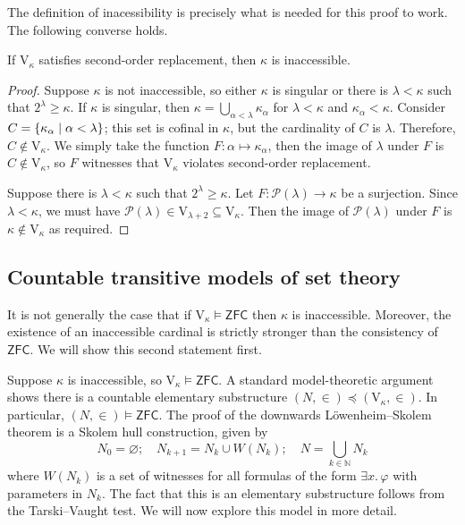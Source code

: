 The definition of inacessibility is precisely what is needed for this proof to work.
The following converse holds.
\begin{theorem}[Shepherdson]
    If \( \mathrm{V}_\kappa \) satisfies second-order replacement, then \( \kappa \) is inaccessible.
\end{theorem}
\begin{proof}
    Suppose \( \kappa \) is not inaccessible, so either \( \kappa \) is singular or there is \( \lambda < \kappa \) such that \( 2^\lambda \geq \kappa \).
    If \( \kappa \) is singular, then \( \kappa = \bigcup_{\alpha < \lambda} \kappa_\alpha \) for \( \lambda < \kappa \) and \( \kappa_\alpha < \kappa \).
    Consider \( C = \qty{\kappa_\alpha \mid \alpha < \lambda} \); this set is cofinal in \( \kappa \), but the cardinality of \( C \) is \( \lambda \).
    Therefore, \( C \notin \mathrm{V}_\kappa \).
    We simply take the function \( F : \alpha \mapsto \kappa_\alpha \), then the image of \( \lambda \) under \( F \) is \( C \notin \mathrm{V}_\kappa \), so \( F \) witnesses that \( \mathrm{V}_\kappa \) violates second-order replacement.

    Suppose there is \( \lambda < \kappa \) such that \( 2^\lambda \geq \kappa \).
    Let \( F : \mathcal P(\lambda) \to \kappa \) be a surjection.
    Since \( \lambda < \kappa \), we must have \( \mathcal P(\lambda) \in \mathrm{V}_{\lambda + 2} \subseteq \mathrm{V}_\kappa \).
    Then the image of \( \mathcal P(\lambda) \) under \( F \) is \( \kappa \notin \mathrm{V}_\kappa \) as required.
\end{proof}

\subsection{Countable transitive models of set theory}
It is not generally the case that if \( \mathrm{V}_\kappa \vDash \mathsf{ZFC} \) then \( \kappa \) is inaccessible.
Moreover, the existence of an inaccessible cardinal is strictly stronger than the consistency of \( \mathsf{ZFC} \).
We will show this second statement first.

Suppose \( \kappa \) is inaccessible, so \( \mathrm{V}_\kappa \vDash \mathsf{ZFC} \).
A standard model-theoretic argument shows there is a countable elementary substructure \( (N, \in) \preceq (\mathrm{V}_\kappa, \in) \).
In particular, \( (N, \in) \vDash \mathsf{ZFC} \).
The proof of the downwards L\"owenheim--Skolem theorem is a Skolem hull construction, given by
\[ N_0 = \varnothing;\quad N_{k+1} = N_k \cup W(N_k);\quad N = \bigcup_{k \in \mathbb N} N_k \]
where \( W(N_k) \) is a set of witnesses for all formulas of the form \( \exists x.\, \varphi \) with parameters in \( N_k \).
The fact that this is an elementary substructure follows from the Tarski--Vaught test.
We will now explore this model in more detail.

